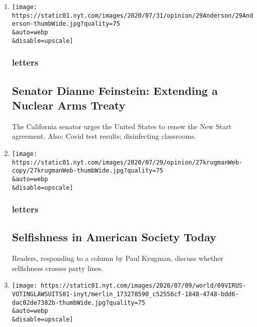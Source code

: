 \begin{enumerate}
\def\labelenumi{\arabic{enumi}.}
\item
  \href{/2020/08/03/opinion/letters/nuclear-arms-treaty.html}{}

  \texttt{[image: https://static01.nyt.com/images/2020/07/31/opinion/29Anderson/29Anderson-thumbWide.jpg?quality=75\\\&auto=webp\\\&disable=upscale]}

  \hypertarget{letters}{%
  \subsubsection{letters}\label{letters}}

  \hypertarget{senator-dianne-feinstein-extending-a-nuclear-arms-treaty}{%
  \subsection{Senator Dianne Feinstein: Extending a Nuclear Arms
  Treaty}\label{senator-dianne-feinstein-extending-a-nuclear-arms-treaty}}

  The California senator urges the United States to renew the New Start
  agreement. Also: Covid test results; disinfecting classrooms.
\item
  \href{/2020/08/03/opinion/letters/selfishness-society.html}{}

  \texttt{[image: https://static01.nyt.com/images/2020/07/29/opinion/27krugmanWeb-copy/27krugmanWeb-thumbWide.jpg?quality=75\\\&auto=webp\\\&disable=upscale]}

  \hypertarget{letters-1}{%
  \subsubsection{letters}\label{letters-1}}

  \hypertarget{selfishness-in-american-society-today}{%
  \subsection{Selfishness in American Society
  Today}\label{selfishness-in-american-society-today}}

  Readers, responding to a column by Paul Krugman, discuss whether
  selfishness crosses party lines.
\item
  \href{/2020/08/02/opinion/letters/voting-election.html}{}

  \texttt{[image: https://static01.nyt.com/images/2020/07/09/world/09VIRUS-VOTINGLAWSUITS01-inyt/merlin\_173278590\_c52556cf-1848-4748-bdd6-dac02de7382b-thumbWide.jpg?quality=75\\\&auto=webp\\\&disable=upscale]}


\end{enumerate}
